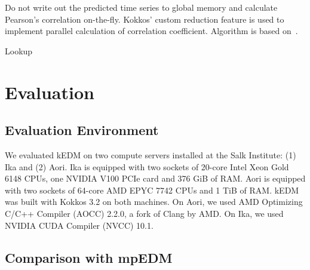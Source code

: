 \documentclass[conference]{IEEEtran}
\begin{document}
Do not write out the predicted time series to global memory and calculate
Pearson’s correlation on-the-fly. Kokkos’ custom reduction feature is used to
implement parallel calculation of correlation coefficient. Algorithm is
based on~\cite{Schubert2018}.

\begin{algorithm}
    \SetAlgoLined
    \DontPrintSemicolon
    \caption{Lookup}%
    \label{alg:lookup}
\end{algorithm}

\section{Evaluation}\label{sec:evaluation}

\subsection{Evaluation Environment}


We evaluated kEDM on two compute servers installed at the Salk Institute: (1)
Ika and (2) Aori. Ika is equipped with two sockets of 20-core Intel Xeon Gold
6148 CPUs, one NVIDIA V100 PCIe card and 376 GiB of RAM\@. Aori is equipped with
two sockets of 64-core AMD EPYC 7742 CPUs and 1 TiB of RAM\@. kEDM was built
with Kokkos 3.2 on both machines. On Aori, we used AMD Optimizing C/C++ Compiler
(AOCC) 2.2.0, a fork of Clang by AMD. On Ika, we used NVIDIA CUDA Compiler (NVCC)
10.1.

\subsection{Comparison with mpEDM}
\end{document}
